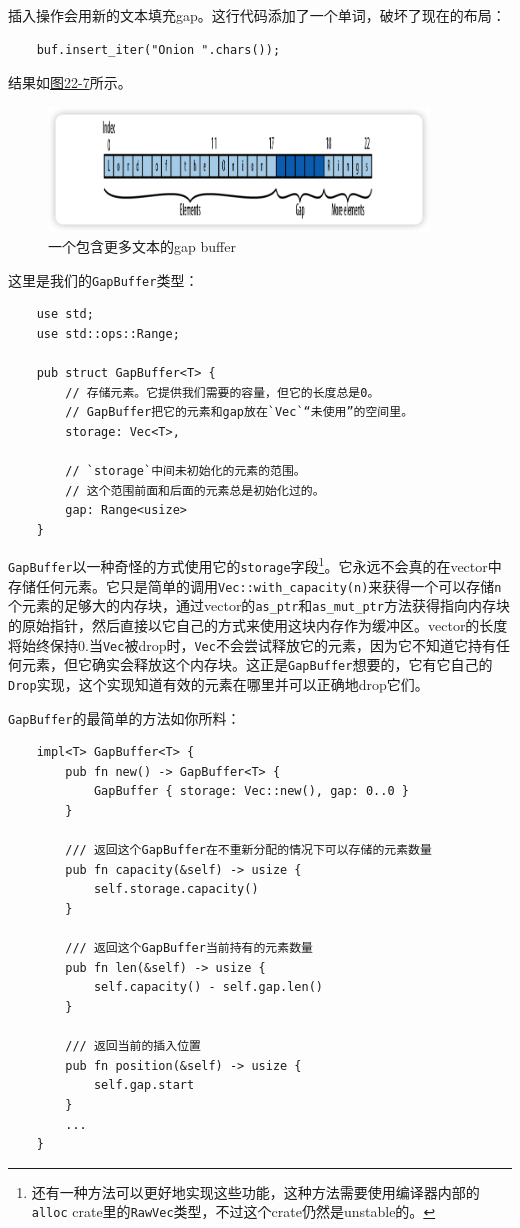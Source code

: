 插入操作会用新的文本填充gap。这行代码添加了一个单词，破坏了现在的布局：
\begin{verbatim}
    buf.insert_iter("Onion ".chars());
\end{verbatim}

结果如\hyperref[f22-7]{图22-7}所示。

\begin{figure}[htbp]
    \centering
    \includegraphics[width=0.9\textwidth]{../img/f22-7.png}
    \caption{一个包含更多文本的gap buffer}
    \label{f22-7}
\end{figure}

这里是我们的\texttt{GapBuffer}类型：
\begin{verbatim}
    use std;
    use std::ops::Range;

    pub struct GapBuffer<T> {
        // 存储元素。它提供我们需要的容量，但它的长度总是0。
        // GapBuffer把它的元素和gap放在`Vec`“未使用”的空间里。
        storage: Vec<T>,

        // `storage`中间未初始化的元素的范围。
        // 这个范围前面和后面的元素总是初始化过的。
        gap: Range<usize>
    }
\end{verbatim}

\texttt{GapBuffer}以一种奇怪的方式使用它的\texttt{storage}字段\footnote{还有一种方法可以更好地实现这些功能，这种方法需要使用编译器内部的\texttt{alloc} crate里的\texttt{RawVec}类型，不过这个crate仍然是unstable的。}。它永远不会真的在vector中存储任何元素。它只是简单的调用\texttt{Vec::with\_capacity(n)}来获得一个可以存储\texttt{n}个元素的足够大的内存块，通过vector的\texttt{as\_ptr}和\texttt{as\_mut\_ptr}方法获得指向内存块的原始指针，然后直接以它自己的方式来使用这块内存作为缓冲区。vector的长度将始终保持0.当\texttt{Vec}被drop时，\texttt{Vec}不会尝试释放它的元素，因为它不知道它持有任何元素，但它确实会释放这个内存块。这正是\texttt{GapBuffer}想要的，它有它自己的\texttt{Drop}实现，这个实现知道有效的元素在哪里并可以正确地drop它们。

\texttt{GapBuffer}的最简单的方法如你所料：
\begin{verbatim}
    impl<T> GapBuffer<T> {
        pub fn new() -> GapBuffer<T> {
            GapBuffer { storage: Vec::new(), gap: 0..0 }
        }

        /// 返回这个GapBuffer在不重新分配的情况下可以存储的元素数量
        pub fn capacity(&self) -> usize {
            self.storage.capacity()
        }

        /// 返回这个GapBuffer当前持有的元素数量
        pub fn len(&self) -> usize {
            self.capacity() - self.gap.len()
        }

        /// 返回当前的插入位置
        pub fn position(&self) -> usize {
            self.gap.start
        }
        ...
    }
\end{verbatim}


